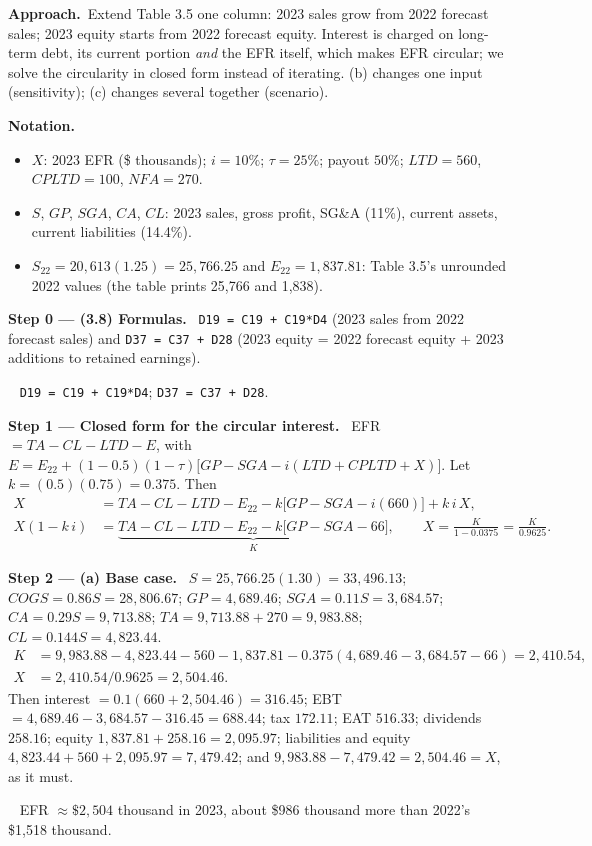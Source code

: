 \documentclass[11pt,a4paper]{article}
\newcommand{\notation}{\par\noindent\textbf{Notation.}}
\newcommand{\step}[2]{\par\medskip\noindent\textbf{Step #1 --- #2.}~}
\newcommand{\approach}{\par\smallskip\noindent\textbf{Approach.}~}
\newcommand{\answer}[1]{\par\smallskip\noindent\fbox{\textbf{Answer #1.}}~}
\begin{document}
\approach Extend Table 3.5 one column: 2023 sales grow from 2022 forecast sales; 2023 equity starts
from 2022 forecast equity. Interest is charged on long-term debt, its current portion \emph{and} the
EFR itself, which makes EFR circular; we solve the circularity in closed form instead of iterating.
(b) changes one input (sensitivity); (c) changes several together (scenario).

\notation
\begin{itemize}
  \item $X$: 2023 EFR (\$ thousands); $i=10\%$; $\tau=25\%$; payout $50\%$; $LTD=560$, $CPLTD=100$, $NFA=270$.
  \item $S$, $GP$, $SGA$, $CA$, $CL$: 2023 sales, gross profit, SG\&A (11\%), current assets, current liabilities (14.4\%).
  \item $S_{22}=20{,}613(1.25)=25{,}766.25$ and $E_{22}=1{,}837.81$: Table 3.5's unrounded 2022 values (the table prints 25,766 and 1,838).
\end{itemize}

\step{0}{(3.8) Formulas} \texttt{D19 = C19 + C19*D4} (2023 sales from 2022 forecast sales) and
\texttt{D37 = C37 + D28} (2023 equity = 2022 forecast equity + 2023 additions to retained earnings).
\answer{(3.8)} \texttt{D19 = C19 + C19*D4}; \texttt{D37 = C37 + D28}.

\step{1}{Closed form for the circular interest} EFR $=TA-CL-LTD-E$, with
$E=E_{22}+(1-0.5)(1-\tau)\big[GP-SGA-i(LTD+CPLTD+X)\big]$. Let $k=(0.5)(0.75)=0.375$. Then
\begin{align}
  X &= TA-CL-LTD-E_{22}-k\big[GP-SGA-i(660)\big]+k\,i\,X, \nonumber\\
  X(1-k\,i) &= \underbrace{TA-CL-LTD-E_{22}-k\big[GP-SGA-66\big]}_{K}, \qquad X=\frac{K}{1-0.0375}=\frac{K}{0.9625}. \label{r2ce12-X}
\end{align}

\step{2}{(a) Base case} $S=25{,}766.25(1.30)=33{,}496.13$; $COGS=0.86S=28{,}806.67$; $GP=4{,}689.46$;
$SGA=0.11S=3{,}684.57$; $CA=0.29S=9{,}713.88$; $TA=9{,}713.88+270=9{,}983.88$; $CL=0.144S=4{,}823.44$.
\begin{align}
  K &= 9{,}983.88-4{,}823.44-560-1{,}837.81-0.375(4{,}689.46-3{,}684.57-66) = 2{,}410.54, \nonumber\\
  X &= 2{,}410.54/0.9625 = 2{,}504.46. \label{r2ce12-a}
\end{align}
Then interest $=0.1(660+2{,}504.46)=316.45$; EBT $=4{,}689.46-3{,}684.57-316.45=688.44$; tax $172.11$;
EAT $516.33$; dividends $258.16$; equity $1{,}837.81+258.16=2{,}095.97$; liabilities and equity
$4{,}823.44+560+2{,}095.97=7{,}479.42$; and $9{,}983.88-7{,}479.42=2{,}504.46=X$, as it must.
\answer{(a)} EFR $\approx\$2{,}504$ thousand in 2023, about \$986 thousand more than 2022's \$1,518 thousand.
\end{document}
